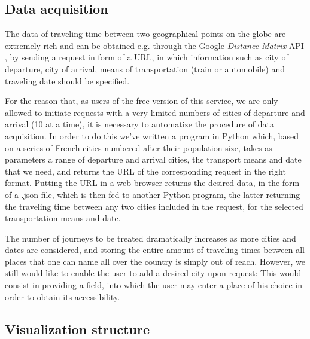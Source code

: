 \documentclass{vgtc}                          %
\begin{document}
\vspace{0.1cm}

\subsection{Data acquisition}

\vspace{0.2cm}

The data of traveling time between two geographical points on the globe are extremely rich and can be obtained e.g. through the Google \textit{Distance Matrix} API \cite{APIGoogle},
by sending a request in form of a URL, in which information such as city of departure, city of arrival, means of transportation (train or automobile) and traveling date should be specified.  
  

For the reason that, as users of the free version of this service, we are only allowed to initiate requests with a very limited numbers of cities of departure and arrival (10 at a time), it is necessary to automatize the procedure of data acquisition. In order to do this we've written a program in Python which, based on a series of French cities numbered after their population size, takes as parameters a range of departure and arrival cities, the transport means and date that we need, and returns the URL of the corresponding request in the right format. Putting the URL in a web browser returns the desired data, in the form of a .json file, which is then fed to another Python program, the latter returning the traveling time between any two cities included in the request, for the selected transportation means and date.  


The number of journeys to be treated dramatically increases as more cities and dates are considered, and storing the entire amount of traveling times between all places that one can name all over the country is simply out of reach. However, we still would like to enable the user to add a desired city upon request: This would consist in providing a field, into which the user may enter a place of his choice in order to obtain its accessibility.



\subsection{Visualization structure}
\end{document}
